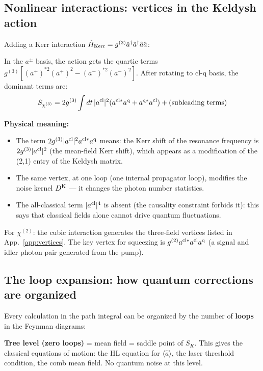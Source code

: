\documentclass[12pt]{article}
\newcommand{\cl}{{\rm cl}}
\newcommand{\q}{{\rm q}}
\newcommand{\Keldysh}{{\rm K}}
\begin{document}
\subsection{Nonlinear interactions: vertices in the Keldysh action}

Adding a Kerr interaction $\hat{H}_{\rm Kerr} = g^{(3)}\hat{a}^\dagger\hat{a}^\dagger\hat{a}\hat{a}$:

In the $a^\pm$ basis, the action gets the quartic terms
$g^{(3)}[(a^+)^{*2}(a^+)^2 - (a^-)^{*2}(a^-)^2]$.
After rotating to cl-q basis, the dominant terms are:
\begin{equation}
  S_{\chi^{(3)}} = 2g^{(3)}\int dt\,|a^\cl|^2(a^{\cl*}a^\q + a^{\q*}a^\cl)
  + \text{(subleading terms)}
  \label{eq:chi3_tutorial}
\end{equation}

\textbf{Physical meaning:}
\begin{itemize}
  \item The term $2g^{(3)}|a^\cl|^2 a^{\cl*}a^\q$ means: the Kerr
    shift of the resonance frequency is $2g^{(3)}|a^\cl|^2$ (the
    mean-field Kerr shift), which appears as a modification of the
    (2,1) entry of the Keldysh matrix.
  \item The same vertex, at one loop (one internal propagator loop),
    modifies the noise kernel $D^\Keldysh$ --- it changes the photon
    number statistics.
  \item The all-classical term $|a^\cl|^4$ is absent (the causality
    constraint forbids it): this says that classical fields alone
    cannot drive quantum fluctuations.
\end{itemize}

For $\chi^{(2)}$: the cubic interaction generates the three-field vertices
listed in App.~\ref{app:vertices}.  The key vertex for squeezing is
$g^{(2)} a^{\cl*} a^\cl a^\q$ (a signal and idler photon pair generated
from the pump).

\subsection{The loop expansion: how quantum corrections are organized}

Every calculation in the path integral can be organized by the number
of \textbf{loops} in the Feynman diagrams:

\textbf{Tree level (zero loops)} = mean field = saddle point of $S_K$.
This gives the classical equations of motion: the HL equation for
$\langle\hat{a}\rangle$, the laser threshold condition, the comb mean
field.  No quantum noise at this level.
\end{document}
